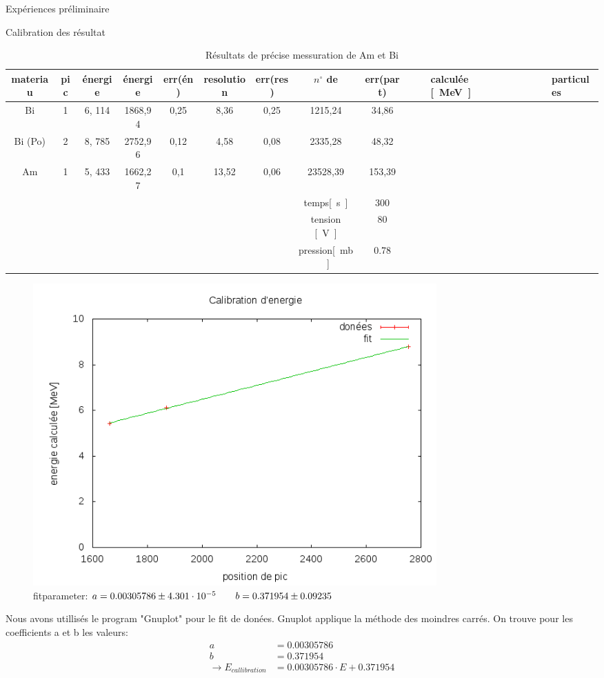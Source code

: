 \documentclass[a4paper,11pt]{scrartcl}
\begin{document}
\begin{section}{Expériences préliminaire}
  \begin{subsection}{Calibration des résultat}
   \begin{table}[htbp]
\caption{Résultats de précise messuration de Am et Bi}
\begin{center}
\begin{tabular}{|c||c||c||c|c|c|c|c|c|}
\hline 
materiau	&	pic	& énergie  &	énergie	&	err(én)	&	resolution	&	err(res)	&	$n^{\circ}$ de 	&	err(part)
& & &calculée \unit{[MeV]} & & && & particules & \\ \hline\hline
Bi	&	1	&	 6, 114 &	1868,94	&	0,25	&	8,36	&	0,25	&	1215,24	&	34,86	\\ \hline
Bi (Po)	&	2	&	 8, 785 &	2752,96	&	0,12	&	4,58	&	0,08	&	2335,28	&	48,32	\\ \hline
Am	&	1	&	 5, 433 &	1662,27	&	0,1	&	13,52	&	0,06	&	23528,39	&	153,39	\\ \hline\hline
{} & temps\unit{[s]} & 300 \\ 
 & tension \unit{[V]}& 80 \\ 
 & pression\unit{[mb]}& 0.78 \\ \hline
\end{tabular}
\end{center}
\end{table}


\begin{figure}
\begin{center}
   \includegraphics[width=0.75\textwidth]{Bilder/calibration.png}
\caption[calibration d'energie]{fitparameter: $ a = 0.00305786  \pm 4.301\cdot 10^{-5} \hspace{2 em} b = 0.371954  \pm 0.09235$ }
  \end{center}
\end{figure}
  \end{subsection}
  Nous avons utillisés le program "Gnuplot" pour le fit de donées. Gnuplot applique la méthode des moindres carrés. On trouve pour les coefficients a et b les valeurs:
\begin{align*}
a&= 0.00305786 \\
b&= 0.371954 \\
\rightarrow E_{callibration} &= 0.00305786  \cdot E +0.371954 
\end{align*}


\end{section}
\end{document}
